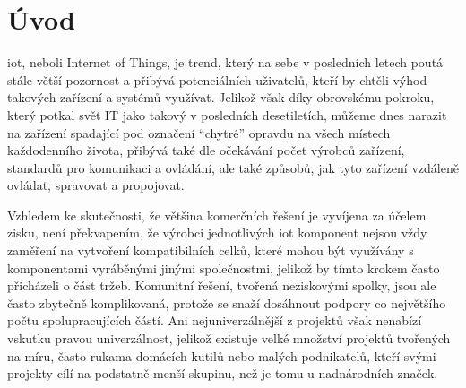 

\chapter*{Úvod}
\setcounter{page}{1}


\acrshort{iot}, neboli Internet of Things, je trend, který na sebe v posledních letech poutá stále větší pozornost a přibývá potenciálních uživatelů, kteří by chtěli výhod takových zařízení a systémů využívat. Jelikož však díky obrovskému pokroku, který potkal svět IT jako takový v posledních desetiletích, můžeme dnes narazit na zařízení spadající pod označení \enquote{chytré} opravdu na všech místech každodenního života, přibývá také dle očekávání počet výrobců zařízení, standardů pro komunikaci a ovládání, ale také způsobů, jak tyto zařízení vzdáleně ovládat, spravovat a propojovat.

Vzhledem ke skutečnosti, že většina komerčních řešení je vyvíjena za účelem zisku, není překvapením, že výrobci jednotlivých \acrshort{iot} komponent nejsou vždy zaměření na vytvoření kompatibilních celků, které mohou být využívány s komponentami vyráběnými jinými společnostmi, jelikož by tímto krokem často přicházeli o část tržeb. Komunitní řešení, tvořená neziskovými spolky, jsou ale často zbytečně komplikovaná, protože se snaží dosáhnout podpory co největšího počtu spolupracujících částí. Ani nejuniverzálnější z projektů však nenabízí vskutku pravou univerzálnost, jelikož existuje velké množství projektů tvořených na míru, často rukama domácích kutilů nebo malých podnikatelů, kteří svými projekty cílí na podstatně menší skupinu, než je tomu u nadnárodních značek.

